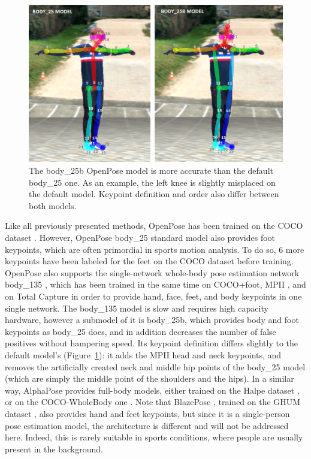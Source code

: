 \begin{figure}[hbtp]
	\centering
	\def\svgwidth{1\columnwidth}
	\fontsize{10pt}{10pt}\selectfont
	\includegraphics[width=1\linewidth]{"../Chap2/Figures/Fig_body25b.png"}
	\caption{The body\_25b OpenPose model is more accurate than the default body\_25 one. As an example, the left knee is slightly misplaced on the default model. Keypoint definition and order also differ between both models.} 
	\label{fig_body25b}
\end{figure}

Like all previously presented methods, OpenPose has been trained on the COCO dataset \cite{Lin2014}. However, OpenPose body\_25 standard model also provides foot keypoints, which are often primordial in sports motion analysis. To do so, 6 more keypoints have been labeled for the feet on the COCO dataset before training. OpenPose also supports the single-network whole-body pose estimation network body\_135 \cite{Hidalgo2019}, which has been trained in the same time on COCO+foot,  MPII \cite{Andriluka2014}, and on Total Capture \cite{Xiang2019} in order to provide hand, face, feet, and body keypoints in one single network. The body\_135 model is slow and requires high capacity hardware, however a submodel of it is body\_25b, which provides body and foot keypoints as body\_25 does, and in addition decreases the number of false positives without hampering speed. Its keypoint definition differs slightly to the default model's (Figure~\ref{fig_body25b}): it adds the MPII head and neck keypoints, and removes the artificially created neck and middle hip points of the body\_25 model (which are simply the middle point of the shoulders and the hips). In a similar way, AlphaPose provides full-body models, either trained on the Halpe dataset \cite{Li2020}, or on the COCO-WholeBody one \cite{Xu2022}. Note that BlazePose \cite{Bazarevsky2020}, trained on the GHUM dataset \cite{Xu2020b}, also provides hand and feet keypoints, but since it is a single-person pose estimation model, the architecture is different and will not be addressed here. Indeed, this is rarely suitable in sports conditions, where people are usually present in the background. 


